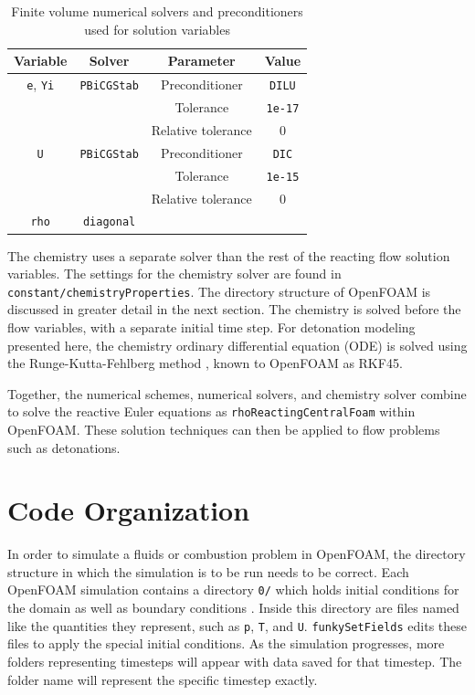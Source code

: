 \begin{table}[t!]
\centering
\caption{Finite volume numerical solvers and preconditioners used for solution variables}
\label{tab:numerics}
\begin{tabular}{cccc}
Variable & Solver & Parameter & Value \\ \hline 
\verb|e|, \verb|Yi| & \verb|PBiCGStab| & Preconditioner & \verb|DILU| \\ 
& & Tolerance & \verb|1e-17| \\ 
& & Relative tolerance & 0 \\\hline
\verb|U| & \verb|PBiCGStab| & Preconditioner & \verb|DIC| \\ 
& & Tolerance & \verb|1e-15| \\ 
& & Relative tolerance & 0 \\\hline
\verb|rho| & \verb|diagonal| & & \\
\end{tabular}
\end{table}

The chemistry uses a separate solver than the rest of the reacting flow solution variables. The settings for the chemistry solver are found in \verb|constant/chemistryProperties|. The directory structure of OpenFOAM is discussed in greater detail in the next section. The chemistry is solved before the flow variables, with a separate initial time step. For detonation modeling presented here, the chemistry ordinary differential equation (ODE) is solved using the Runge-Kutta-Fehlberg method \cite{rkf}, known to OpenFOAM as RKF45. 

Together, the numerical schemes, numerical solvers, and chemistry solver combine to solve the reactive Euler equations as \verb|rhoReactingCentralFoam| within OpenFOAM. These solution techniques can then be applied to flow problems such as detonations. 

\section{Code Organization}
In order to simulate a fluids or combustion problem in OpenFOAM, the directory structure in which the simulation is to be run needs to be correct. Each OpenFOAM simulation contains a directory \verb|0/| which holds initial conditions for the domain as well as boundary conditions \cite{ofug}. Inside this directory are files named like the quantities they represent, such as \verb|p|, \verb|T|, and \verb|U|. \verb|funkySetFields| edits these files to apply the special initial conditions. As the simulation progresses, more folders representing timesteps will appear with data saved for that timestep. The folder name will represent the specific timestep exactly. 


